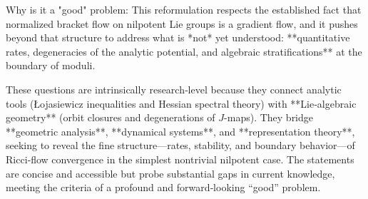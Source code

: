 Why is it a "good" problem:  
This reformulation respects the established fact that normalized bracket flow on nilpotent Lie groups is a gradient flow, and it pushes beyond that structure to address what is *not* yet understood: **quantitative rates, degeneracies of the analytic potential, and algebraic stratifications** at the boundary of moduli.  

These questions are intrinsically research‑level because they connect analytic tools (Łojasiewicz inequalities and Hessian spectral theory) with **Lie‑algebraic geometry** (orbit closures and degenerations of \(J\)-maps).  
They bridge **geometric analysis**, **dynamical systems**, and **representation theory**, seeking to reveal the fine structure—rates, stability, and boundary behavior—of Ricci‑flow convergence in the simplest nontrivial nilpotent case.  
The statements are concise and accessible but probe substantial gaps in current knowledge, meeting the criteria of a profound and forward‑looking “good” problem.